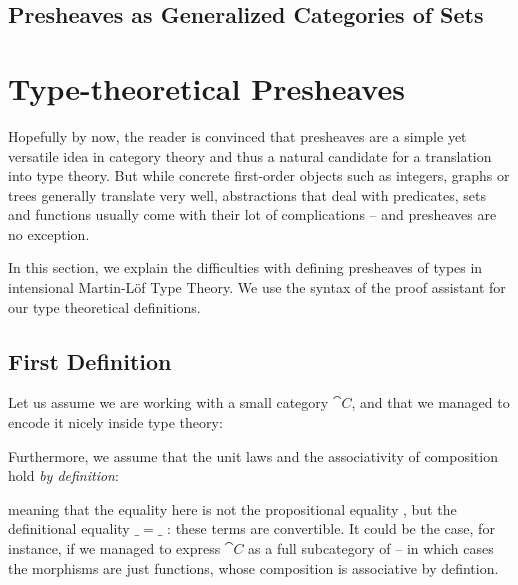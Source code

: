
\subsection{Presheaves as Generalized Categories of Sets}




\section{Type-theoretical Presheaves}\label{sec:intensional-problems}

Hopefully by now, the reader is convinced that presheaves are a simple yet 
versatile idea in category theory and thus a natural candidate for a 
translation into type theory.
% 
But while concrete first-order objects such as integers, graphs or trees 
generally translate very well, abstractions that deal with predicates, sets
and functions usually come with their lot of complications -- and presheaves
are no exception.

In this section, we explain the difficulties with defining presheaves of types
in intensional Martin-Löf Type Theory. 
% 
We use the syntax of the \Agda proof assistant for our type theoretical 
definitions.

\subsection{First Definition}

Let us assume we are working with a small category \( \cat{C} \), and that we
managed to encode it nicely inside type theory:


Furthermore, we assume that the unit laws and the associativity of
composition hold \emph{by definition}:


% 
meaning that the equality here is not the propositional equality ,
but the definitional equality \( \_=\_\) : these terms are convertible. 
% 
It could be the case, for instance, if we managed to express \( \cat{C} \) as a 
full subcategory of  -- in which cases the morphisms are just 
functions, whose composition is associative by defintion.

